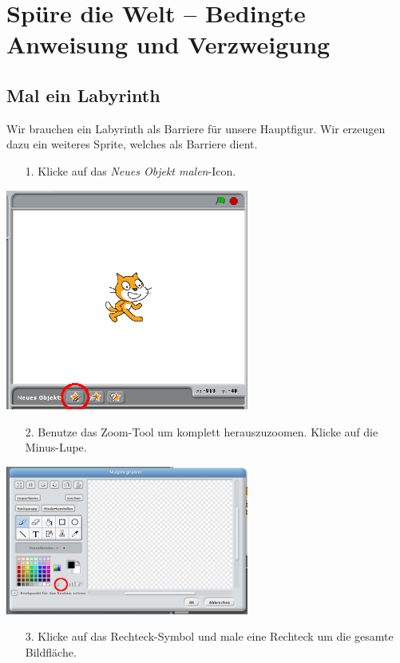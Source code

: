 \section{Spüre die Welt – Bedingte Anweisung und Verzweigung}

\subsection{Mal ein Labyrinth}

Wir brauchen ein Labyrinth als Barriere für unsere Hauptfigur. Wir erzeugen dazu ein weiteres Sprite, welches als Barriere dient.

\begin{itemize}
\item[1.] Klicke auf das \textit{Neues Objekt malen}-Icon.
\end{itemize}
\includegraphics[width=0.6\textwidth]{images/aufgabe2_neues_objekt_malen.png}
\begin{itemize}
\item[2.] Benutze das Zoom-Tool um komplett herauszuzoomen. Klicke auf die Minus-Lupe.
\end{itemize}
\includegraphics[width=0.6\textwidth]{images/aufgabe2_zoom.png}
\begin{itemize}
\item[3.] Klicke auf das Rechteck-Symbol und male eine Rechteck um die gesamte Bildfläche.
\end{itemize}
